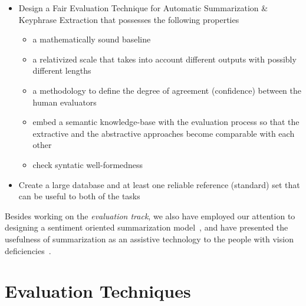\documentclass[a4paper]{report}
\begin{document}
\begin{itemize}
\item Design a Fair Evaluation Technique for Automatic Summarization \& Keyphrase Extraction that possesses the following properties
\begin{itemize}  
\item a mathematically sound baseline
\item a relativized scale that takes into account different outputs with possibly different lengths
\item a methodology to define the degree of agreement (confidence) between the human evaluators
\item embed a semantic knowledge-base with the evaluation process so that the extractive and the abstractive approaches become comparable with each other
\item check syntatic well-formedness
\end{itemize} 
\item Create a large database and at least one reliable reference (standard) set that can be useful to both of the tasks
\end{itemize}
Besides working on the \emph{evaluation track}, we also have employed our attention to designing a sentiment oriented summarization model~\cite{DBLP:conf/cicling/HamidT15}, and have presented the usefulness of summarization as an assistive technology to the people with vision deficiencies~\cite{DBLP:conf/petra/HamidT14}. 



\chapter{Evaluation Techniques}
\label{eval}
\end{document}
